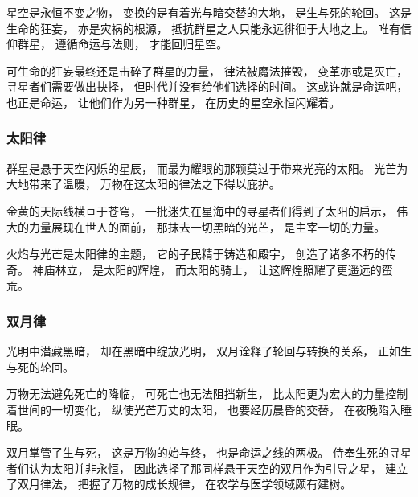 \documentclass[UTF8,12pt,draft]{ctexbook}
\begin{document}
                星空是永恒不变之物，
                变换的是有着光与暗交替的大地，
                是生与死的轮回。
                这是生命的狂妄，
                亦是灾祸的根源，
                抵抗群星之人只能永远徘徊于大地之上。
                唯有信仰群星，
                遵循命运与法则，
                才能回归星空。

                可生命的狂妄最终还是击碎了群星的力量，
                律法被魔法摧毁，
                变革亦或是灭亡，
                寻星者们需要做出抉择，
                但时代并没有给他们选择的时间。
                这或许就是命运吧，
                也正是命运，
                让他们作为另一种群星，
                在历史的星空永恒闪耀着。
                \subsubsection{太阳律}
                    群星是悬于天空闪烁的星辰，
                    而最为耀眼的那颗莫过于带来光亮的太阳。
                    光芒为大地带来了温暖，
                    万物在这太阳的律法之下得以庇护。

                    金黄的天际线横亘于苍穹，
                    一批迷失在星海中的寻星者们得到了太阳的启示，
                    伟大的力量展现在世人的面前，
                    那抹去一切黑暗的光芒，
                    是主宰一切的力量。

                    火焰与光芒是太阳律的主题，
                    它的子民精于铸造和殿宇，
                    创造了诸多不朽的传奇。
                    神庙林立，
                    是太阳的辉煌，
                    而太阳的骑士，
                    让这辉煌照耀了更遥远的蛮荒。
                \subsubsection{双月律}
                    光明中潜藏黑暗，
                    却在黑暗中绽放光明，
                    双月诠释了轮回与转换的关系，
                    正如生与死的轮回。

                    万物无法避免死亡的降临，
                    可死亡也无法阻挡新生，
                    比太阳更为宏大的力量控制着世间的一切变化，
                    纵使光芒万丈的太阳，
                    也要经历晨昏的交替，
                    在夜晚陷入睡眠。

                    双月掌管了生与死，
                    这是万物的始与终，
                    也是命运之线的两极。
                    侍奉生死的寻星者们认为太阳并非永恒，
                    因此选择了那同样悬于天空的双月作为引导之星，
                    建立了双月律法，
                    把握了万物的成长规律，
                    在农学与医学领域颇有建树。
\end{document}
